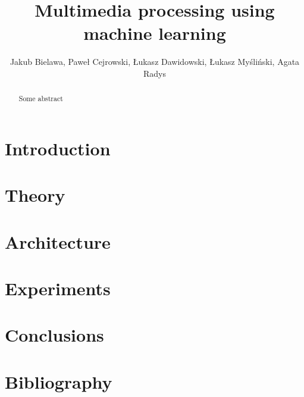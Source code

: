 \documentclass[journal, a4paper]{IEEEtran}
\begin{document}
	\title{Multimedia processing using machine learning}
	\author{Jakub Bielawa, Paweł Cejrowski, Łukasz Dawidowski, Łukasz Myśliński, Agata Radys}
	\maketitle

\begin{abstract}
Some abstract
\end{abstract}

\section{Introduction}
\section{Theory}
\section{Architecture}
\section{Experiments}
\section{Conclusions}
\section{Bibliography}
\end{document}
